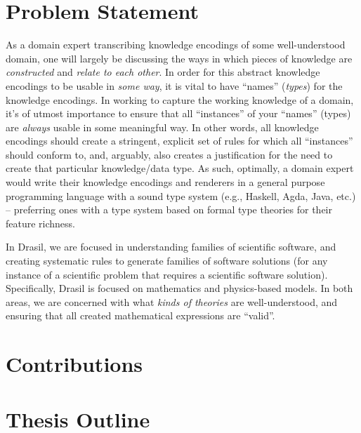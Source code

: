 

\section{Problem Statement}


As a domain expert transcribing knowledge encodings of some
well-understood domain, one will largely be discussing the ways in which
pieces of knowledge are \textit{constructed} and \textit{relate to each other}.
In order for this abstract knowledge encodings to be usable in \textit{some way},
it is vital to have ``names'' (\textit{types}) for the knowledge encodings. In
working to capture the working knowledge of a domain, it's of utmost importance
to ensure that all ``instances'' of your ``names'' (types) are \textit{always}
usable in some meaningful way. In other words, all knowledge encodings should
create a stringent, explicit set of rules for which all ``instances'' should
conform to, and, arguably, also creates a justification for the need to create
that particular knowledge/data type. As such, optimally, a domain expert would
write their knowledge encodings and renderers in a general purpose programming
language with a sound type system (e.g., Haskell, Agda, Java, etc.) -- preferring
ones with a type system based on formal type theories for their feature richness.

In Drasil, we are focused in understanding families of scientific software, and
creating systematic rules to generate families of software solutions (for any
instance of a scientific problem that requires a scientific software solution).
Specifically, Drasil is focused on mathematics and physics-based models. In both
areas, we are concerned with what \textit{kinds of theories} are
well-understood, and ensuring that all created mathematical expressions are
``valid''. 

\section{Contributions}


\section{Thesis Outline}


